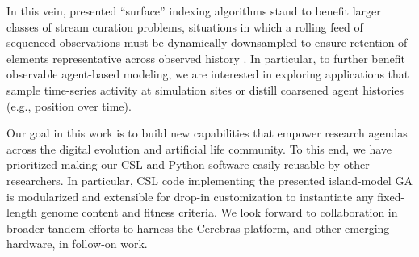 In this vein, presented ``surface'' indexing algorithms stand to benefit larger classes of stream curation problems, situations in which a rolling feed of sequenced observations must be dynamically downsampled to ensure retention of elements representative across observed history \citep{moreno2024algorithms}.
In particular, to further benefit observable agent-based modeling, we are interested in exploring applications that sample time-series activity at simulation sites or distill coarsened agent histories (e.g., position over time).

Our goal in this work is to build new capabilities that empower research agendas across the digital evolution and artificial life community.
To this end, we have prioritized making our CSL and Python software easily reusable by other researchers.
In particular, CSL code implementing the presented island-model GA is modularized and extensible for drop-in customization to instantiate any fixed-length genome content and fitness criteria.
We look forward to collaboration in broader tandem efforts to harness the Cerebras platform, and other emerging hardware, in follow-on work.
